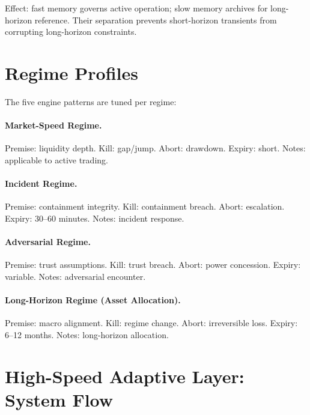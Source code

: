 \noindent
Effect: fast memory governs active operation; slow memory archives
for long-horizon reference. Their separation prevents short-horizon
transients from corrupting long-horizon constraints.

\section{Regime Profiles}
\label{sec:limit-regimes}

The five engine patterns are tuned per regime:

\paragraph{Market-Speed Regime.}
Premise: liquidity depth. Kill: gap/jump. Abort: drawdown.
Expiry: short. Notes: applicable to active trading.

\paragraph{Incident Regime.}
Premise: containment integrity. Kill: containment breach.
Abort: escalation. Expiry: 30--60 minutes. Notes: incident response.

\paragraph{Adversarial Regime.}
Premise: trust assumptions. Kill: trust breach. Abort: power
concession. Expiry: variable. Notes: adversarial encounter.

\paragraph{Long-Horizon Regime (Asset Allocation).}
Premise: macro alignment. Kill: regime change. Abort: irreversible
loss. Expiry: 6--12 months. Notes: long-horizon allocation.

\section{High-Speed Adaptive Layer: System Flow}
\label{sec:limit-system-flow}

